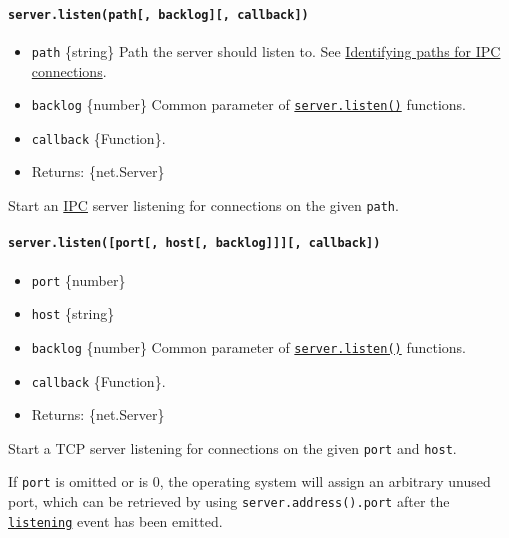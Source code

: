 \paragraph{\texorpdfstring{\texttt{server.listen(path{[},\ backlog{]}{[},\ callback{]})}}{server.listen(path{[}, backlog{]}{[}, callback{]})}}\label{server.listenpath-backlog-callback}

\begin{itemize}
\tightlist
\item
  \texttt{path} \{string\} Path the server should listen to. See
  \hyperref[identifying-paths-for-ipc-connections]{Identifying paths for
  IPC connections}.
\item
  \texttt{backlog} \{number\} Common parameter of
  \hyperref[serverlisten]{\texttt{server.listen()}} functions.
\item
  \texttt{callback} \{Function\}.
\item
  Returns: \{net.Server\}
\end{itemize}

Start an \hyperref[ipc-support]{IPC} server listening for connections on
the given \texttt{path}.

\paragraph{\texorpdfstring{\texttt{server.listen({[}port{[},\ host{[},\ backlog{]}{]}{]}{[},\ callback{]})}}{server.listen({[}port{[}, host{[}, backlog{]}{]}{]}{[}, callback{]})}}\label{server.listenport-host-backlog-callback}

\begin{itemize}
\tightlist
\item
  \texttt{port} \{number\}
\item
  \texttt{host} \{string\}
\item
  \texttt{backlog} \{number\} Common parameter of
  \hyperref[serverlisten]{\texttt{server.listen()}} functions.
\item
  \texttt{callback} \{Function\}.
\item
  Returns: \{net.Server\}
\end{itemize}

Start a TCP server listening for connections on the given \texttt{port}
and \texttt{host}.

If \texttt{port} is omitted or is 0, the operating system will assign an
arbitrary unused port, which can be retrieved by using
\texttt{server.address().port} after the
\hyperref[event-listening]{\texttt{\textquotesingle{}listening\textquotesingle{}}}
event has been emitted.

